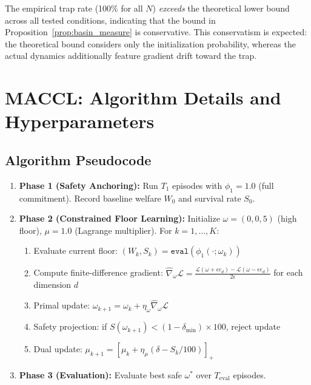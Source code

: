 The empirical trap rate (100\% for all $N$) \emph{exceeds}
the theoretical lower bound across all tested conditions,
indicating that the bound in
Proposition~\ref{prop:basin_measure} is conservative.
This conservatism is expected: the theoretical bound considers
only the initialization probability, whereas the actual dynamics
additionally feature gradient drift toward the trap.


\section{MACCL: Algorithm Details and Hyperparameters}
\label{app:maccl}

\subsection{Algorithm Pseudocode}

\begin{enumerate}
  \item \textbf{Phase 1 (Safety Anchoring):}
    Run $T_1$ episodes with $\phi_1 = 1.0$ (full commitment).
    Record baseline welfare $W_0$ and survival rate $S_0$.
  \item \textbf{Phase 2 (Constrained Floor Learning):}
    Initialize $\omega = (0, 0, 5)$ (high floor),
    $\mu = 1.0$ (Lagrange multiplier).
    For $k = 1, \ldots, K$:
    \begin{enumerate}
      \item Evaluate current floor: $(W_k, S_k) = \texttt{eval}(\phi_1(\cdot; \omega_k))$
      \item Compute finite-difference gradient:
        $\hat{\nabla}_\omega \mathcal{L} = \frac{\mathcal{L}(\omega + \epsilon e_d) - \mathcal{L}(\omega - \epsilon e_d)}{2\epsilon}$
        for each dimension $d$
      \item Primal update: $\omega_{k+1} = \omega_k + \eta_\omega \hat{\nabla}_\omega \mathcal{L}$
      \item Safety projection: if $S(\omega_{k+1}) < (1 - \delta_{\min}) \times 100$, reject update
      \item Dual update: $\mu_{k+1} = [\mu_k + \eta_\mu (\delta - S_k/100)]_+$
    \end{enumerate}
  \item \textbf{Phase 3 (Evaluation):}
    Evaluate best safe $\omega^*$ over $T_{\mathrm{eval}}$ episodes.
\end{enumerate}

